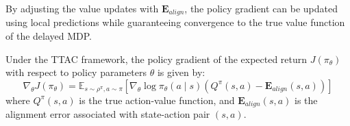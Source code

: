 \documentclass[manuscript, screen, review]{jair}
\begin{document}
By adjusting the value updates with $\mathbf{E}_{align}$, the policy gradient can be updated using local predictions while guaranteeing convergence to the true value function of the delayed MDP.

\begin{theorem}\label{thm:policy_gradient}
Under the TTAC framework, the policy gradient of the expected return $J(\pi_\theta)$ with respect to policy parameters $\theta$ is given by:
\begin{equation}
    \nabla_\theta J(\pi_\theta) = \mathbb{E}_{s \sim \rho^\pi, a \sim \pi} \left[ \nabla_\theta \log \pi_\theta(a \mid s) \left( Q^{\pi}(s, a) - \mathbf{E}_{align}(s, a) \right) \right]
\end{equation}
where $Q^{\pi}(s, a)$ is the true action-value function, and $\mathbf{E}_{align}(s, a)$ is the alignment error associated with state-action pair $(s, a)$.
\end{theorem}
\end{document}
